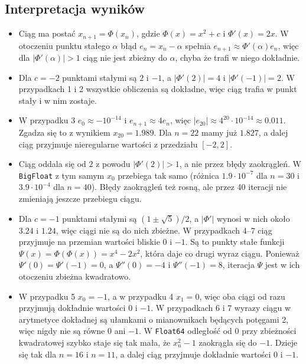 \documentclass[11pt,a4paper]{article}
\begin{document}
\subsection*{Interpretacja wyników}
\begin{itemize}
    \item Ciąg ma postać $x_{n+1} = \Phi(x_n)$, gdzie $\Phi(x) = x^2 + c$ i $\Phi'(x) = 2x$. W otoczeniu punktu stałego $\alpha$ błąd $e_n = x_n - \alpha$ spełnia $e_{n+1} \approx \Phi'(\alpha) e_n$, więc dla $|\Phi'(\alpha)| > 1$ ciąg nie jest zbieżny do $\alpha$, chyba że trafi w niego dokładnie.
    \item Dla $c = -2$ punktami stałymi są $2$ i $-1$, a $|\Phi'(2)| = 4$ i $|\Phi'(-1)| = 2$. W przypadkach 1 i 2 wszystkie obliczenia są dokładne, więc ciąg trafia w punkt stały i w nim zostaje.
    \item W przypadku 3 $e_0 \approx -10^{-14}$ i $e_{n+1} \approx 4 e_n$, więc $|e_{20}| \approx 4^{20} \cdot 10^{-14} \approx 0.011$. Zgadza się to z wynikiem $x_{20} = 1.989$. Dla $n = 22$ mamy już $1.827$, a dalej ciąg przyjmuje nieregularne wartości z przedziału $[-2, 2]$.
    \item Ciąg oddala się od $2$ z powodu $|\Phi'(2)| > 1$, a nie przez błędy zaokrągleń. W \texttt{BigFloat} z tym samym $x_0$ przebiega tak samo (różnica $1.9 \cdot 10^{-7}$ dla $n = 30$ i $3.9 \cdot 10^{-4}$ dla $n = 40$). Błędy zaokrągleń też rosną, ale przez 40 iteracji nie zmieniają jeszcze przebiegu ciągu.
    \item Dla $c = -1$ punktami stałymi są $(1 \pm \sqrt{5})/2$, a $|\Phi'|$ wynosi w nich około $3.24$ i $1.24$, więc ciągi nie są do nich zbieżne. W przypadkach 4--7 ciąg przyjmuje na przemian wartości bliskie $0$ i $-1$. Są to punkty stałe funkcji $\Psi(x) = \Phi(\Phi(x)) = x^4 - 2x^2$, która daje co drugi wyraz ciągu. Ponieważ $\Psi'(0) = \Psi'(-1) = 0$, a $\Psi''(0) = -4$ i $\Psi''(-1) = 8$, iteracja $\Psi$ jest w ich otoczeniu zbieżna kwadratowo.
    \item W przypadku 5 $x_0 = -1$, a w przypadku 4 $x_1 = 0$, więc oba ciągi od razu przyjmują dokładnie wartości $0$ i $-1$. W przypadkach 6 i 7 wyrazy ciągu w arytmetyce dokładnej są ułamkami o mianownikach będących potęgami 2, więc nigdy nie są równe $0$ ani $-1$. W \texttt{Float64} odległość od $0$ przy zbieżności kwadratowej szybko staje się tak mała, że $x_n^2 - 1$ zaokrągla się do $-1$. Dzieje się tak dla $n = 16$ i $n = 11$, a dalej ciąg przyjmuje dokładnie wartości $0$ i $-1$.
\end{itemize}
\end{document}
